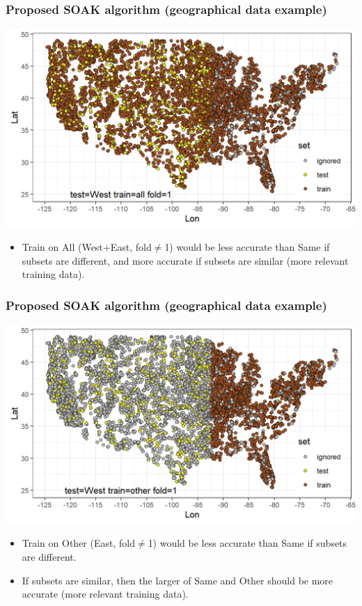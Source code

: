 \documentclass[t]{beamer}
\begin{document}
\begin{frame}
  \frametitle{Proposed SOAK algorithm (geographical data example)}
  \includegraphics[width=\textwidth]{figure-proda-cv-map-West-all}

  \begin{itemize}
  \item Train on All (West+East, fold$\neq$1) would be less accurate
    than Same if subsets are different, and more accurate if subsets
    are similar (more relevant training data).
  \end{itemize}
\end{frame}

\begin{frame}
  \frametitle{Proposed SOAK algorithm (geographical data example)}
  \includegraphics[width=\textwidth]{figure-proda-cv-map-West-other}

  \begin{itemize}
  \item Train on Other (East, fold$\neq$1) would be less accurate than
    Same if subsets are different.
  \item If subsets are similar, then the larger of Same and Other should be
    more accurate (more relevant training data).
  \end{itemize}
\end{frame}
\end{document}
